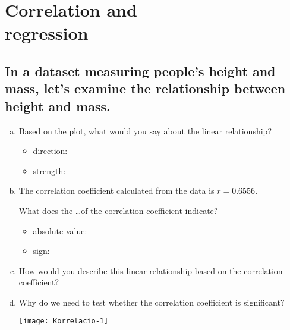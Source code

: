 \chapter[Correlation and regression]{Correlation and\\regression}

\section[Relation of mass and height]{In a dataset measuring people’s height and mass, let’s examine the relationship between height and mass.}



\begin{multicols}{2}
	\begin{enumerate}[a)]
	\item Based on the plot, what would you say about the linear relationship?

		\begin{itemize}
		\item direction: 	\hrulefill	
		\item strength: \hrulefill
		\end{itemize}
	
	\item The correlation coefficient calculated from the data is $r = 0.6556$.

	
	What does the \dots of the correlation coefficient indicate?
	
		\begin{itemize}
		\item absolute value: \hrulefill	%
		\item sign: 	\hrulefill
		\end{itemize}

	\item How would you describe this linear relationship based on the correlation coefficient? \hrulefill	
	\item Why do we need to test whether the correlation coefficient is significant? \hrulefill	
	
		\columnbreak
			\begin{center}
		\texttt{[image: Korrelacio-1]}
		\end{center}
	\end{enumerate}
\end{multicols}

	

